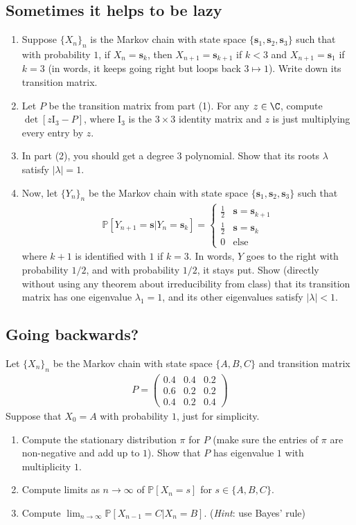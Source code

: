 \documentclass[12pt,reqno]{amsart}
\theoremstyle{definition}
\theoremstyle{remark}
\numberwithin{equation}{section}
\begin{document}
\subsection{Sometimes it helps to be lazy}
\begin{enumerate}
\item Suppose $\{X_{n}\}_{n}$ is the Markov chain with state space $\{\mathbf{s}_{1},\mathbf{s}_{2},\mathbf{s}_{3}\}$ such that with probability $1$, if $X_{n}=\mathbf{s}_{k}$, then $X_{n+1}=\mathbf{s}_{k+1}$ if $k<3$ and $X_{n+1}=\mathbf{s}_{1}$ if $k=3$ (in words, it keeps going right but loops back $3\mapsto1$). Write down its transition matrix.
\item Let $P$ be the transition matrix from part (1). For any $z\in\C$, compute $\det[z\mathrm{I}_{3}-P]$, where $\mathrm{I}_{3}$ is the $3\times3$ identity matrix and $z$ is just multiplying every entry by $z$.
\item In part (2), you should get a degree $3$ polynomial. Show that its roots $\lambda$ satisfy $|\lambda|=1$.
\item Now, let $\{Y_{n}\}_{n}$ be the Markov chain with state space $\{\mathbf{s}_{1},\mathbf{s}_{2},\mathbf{s}_{3}\}$ such that 
%
\begin{align*}
\mathbb{P}[Y_{n+1}=\mathbf{s}|Y_{n}=\mathbf{s}_{k}]=\begin{cases}\frac12&\mathbf{s}=\mathbf{s}_{k+1}\\\frac12&\mathbf{s}=\mathbf{s}_{k}\\0&\mathrm{else}\end{cases}
\end{align*}
%
where $k+1$ is identified with $1$ if $k=3$. In words, $Y$ goes to the right with probability $1/2$, and with probability $1/2$, it stays put. Show (directly without using any theorem about irreducibility from class) that its transition matrix has one eigenvalue $\lambda_{1}=1$, and its other eigenvalues satisfy $|\lambda|<1$.
\end{enumerate}
\subsection{Going backwards?}
Let $\{X_{n}\}_{n}$ be the Markov chain with state space $\{A,B,C\}$ and transition matrix
%
\begin{align*}
P=\begin{pmatrix}0.4&0.4&0.2\\0.6&0.2&0.2\\0.4&0.2&0.4\end{pmatrix}
\end{align*}
%
Suppose that $X_{0}=A$ with probability $1$, just for simplicity.
\begin{enumerate}
\item Compute the stationary distribution $\pi$ for $P$ (make sure the entries of $\pi$ are non-negative and add up to $1$). Show that $P$ has eigenvalue $1$ with multiplicity $1$.
\item Compute limits as $n\to\infty$ of $\mathbb{P}[X_{n}=s]$ for $s\in\{A,B,C\}$.
\item Compute $\lim_{n\to\infty}\mathbb{P}[X_{n-1}=C|X_{n}=B]$. (\emph{Hint}: use Bayes' rule)
\end{enumerate}
\end{document}
